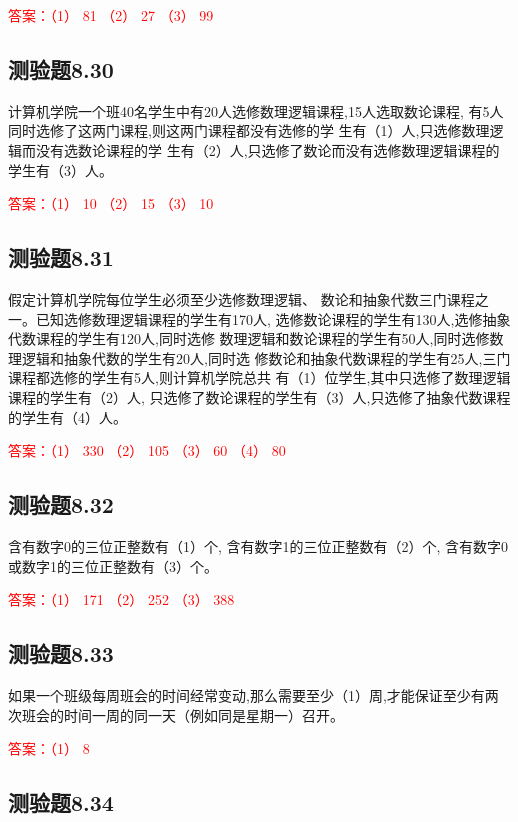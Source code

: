\documentclass[UTF8, heading=true]{ctexart}
\begin{document}
\textcolor{red}{答案：（1） 81 （2） 27 （3） 99}

\subsection{测验题8.30}

计算机学院一个班40名学生中有20人选修数理逻辑课程,15人选取数论课程,
有5人同时选修了这两门课程,则这两门课程都没有选修的学
生有（1）人,只选修数理逻辑而没有选数论课程的学
生有（2）人,只选修了数论而没有选修数理逻辑课程的学生有（3）人。

\textcolor{red}{答案：（1） 10 （2） 15 （3） 10}

\subsection{测验题8.31}

假定计算机学院每位学生必须至少选修数理逻辑、
数论和抽象代数三门课程之一。已知选修数理逻辑课程的学生有170人,
选修数论课程的学生有130人,选修抽象代数课程的学生有120人,同时选修
数理逻辑和数论课程的学生有50人,同时选修数理逻辑和抽象代数的学生有20人,同时选
修数论和抽象代数课程的学生有25人,三门课程都选修的学生有5人,则计算机学院总共
有（1）位学生,其中只选修了数理逻辑课程的学生有（2）人,
只选修了数论课程的学生有（3）人,只选修了抽象代数课程的学生有（4）人。

\textcolor{red}{答案：（1） 330 （2） 105 （3） 60 （4） 80}


\subsection{测验题8.32}

含有数字0的三位正整数有（1）个,
含有数字1的三位正整数有（2）个,
含有数字0或数字1的三位正整数有（3）个。

\textcolor{red}{答案：（1） 171 （2） 252 （3） 388}

\subsection{测验题8.33}

如果一个班级每周班会的时间经常变动,那么需要至少（1）周,才能保证至少有两次班会的时间一周的同一天（例如同是星期一）召开。

\textcolor{red}{答案：（1） 8}


\subsection{测验题8.34}
\end{document}
